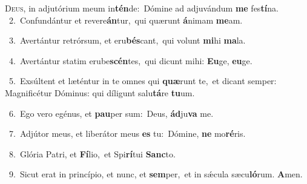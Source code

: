 \lettrine{\initial\textcolor{\initialcolor}{D}}{eus,} in adjutórium meum in\-\textbf{tén}\-de:~\star Dómine ad adjuvándum \textbf{me} fes\-\textbf{tí}\-na.\\
{\numbfont\textcolor{\numbcolor}{~2.}}~Confundántur et revere\-\textbf{án}\-tur,~\star qui quærunt \textbf{á}\-nimam \textbf{me}\-am.\par
{\numbfont\textcolor{\numbcolor}{~3.}}~Avertántur retrórsum, et eru\-\textbf{bés}\-cant,~\star qui volunt \textbf{mi}\-hi \textbf{ma}\-la.\par
{\numbfont\textcolor{\numbcolor}{~4.}}~Avertántur statim erube\-\textbf{scén}\-tes,~\star qui dicunt mihi: \textbf{Eu}\-ge, \textbf{eu}\-ge.\par
{\numbfont\textcolor{\numbcolor}{~5.}}~Exsúltent et læténtur in te omnes qui \textbf{quæ}\-runt te,~\star et dicant semper: Magnificétur Dóminus: qui díligunt salu\-\textbf{tá}\-re \textbf{tu}\-um.\par
{\numbfont\textcolor{\numbcolor}{~6.}}~Ego vero egénus, et \textbf{pau}\-per sum:~\star Deus, \textbf{ád}\-ju\textbf{va} me.\par
{\numbfont\textcolor{\numbcolor}{~7.}}~Adjútor meus, et liberátor meus \textbf{es} tu:~\star Dómine, \textbf{ne} mo\-\textbf{ré}\-ris.\par
{\numbfont\textcolor{\numbcolor}{~8.}}~Glória Patri, et \textbf{Fí}\-lio,~\star et Spi\-\textbf{rí}\-tui \textbf{Sanc}\-to.\par
{\numbfont\textcolor{\numbcolor}{~9.}}~Sicut erat in princípio, et nunc, et \textbf{sem}\-per,~\star et in sǽcula sæcu\-\textbf{ló}\-rum. \textbf{A}\-men.\par
